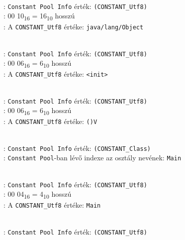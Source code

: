 \begin{compactitem}
\begin{compactitem}
	\item {}   \\
	: \lstinline{Constant Pool Info} érték: \lstinline{(CONSTANT_Utf8)} \\
    : 00 10\textsubscript{16} = 16\textsubscript{10} hosszú \\
    : A \lstinline{CONSTANT_Utf8} értéke: \lstinline{java/lang/Object}
	\item {}   \\
	: \lstinline{Constant Pool Info} érték: \lstinline{(CONSTANT_Utf8)} \\
    : 00 06\textsubscript{16} = 6\textsubscript{10} hosszú \\
    : A \lstinline{CONSTANT_Utf8} értéke: \lstinline{<init>}
	\item {}   \\
	: \lstinline{Constant Pool Info} érték: \lstinline{(CONSTANT_Utf8)} \\
    : 00 06\textsubscript{16} = 6\textsubscript{10} hosszú \\
    : A \lstinline{CONSTANT_Utf8} értéke: \lstinline{()V}
	\item {}  \\
	: \lstinline{Constant Pool Info} érték: \lstinline{(CONSTANT_Class)} \\
    : \lstinline{Constant Pool}-ban lévő indexe az osztály nevének: \lstinline{Main}
	\item {}   \\
	: \lstinline{Constant Pool Info} érték: \lstinline{(CONSTANT_Utf8)} \\
    : 00 04\textsubscript{16} = 4\textsubscript{10} hosszú \\
    : A \lstinline{CONSTANT_Utf8} értéke: \lstinline{Main}
	\item {}   \\
	: \lstinline{Constant Pool Info} érték: \lstinline{(CONSTANT_Utf8)} \\

\end{compactitem}
\end{compactitem}
